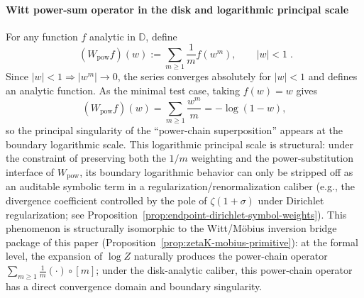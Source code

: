 \paragraph{Witt power-sum operator in the disk and logarithmic principal scale}
For any function \(f\) analytic in \(\mathbb{D}\), define
\begin{equation}\label{eq:app-witt-pow-operator}
\boxed{\;
(W_{\mathrm{pow}}f)(w):=\sum_{m\ge 1}\frac{1}{m}f(w^m),\qquad |w|<1\; }.
\end{equation}
Since \(|w|<1\Rightarrow |w^m|\to 0\), the series converges absolutely for \(|w|<1\) and defines an analytic function.
As the minimal test case, taking \(f(w)=w\) gives
\[
(W_{\mathrm{pow}}f)(w)=\sum_{m\ge 1}\frac{w^m}{m}=-\log(1-w),
\]
so the principal singularity of the ``power-chain superposition'' appears at the boundary logarithmic scale.
This logarithmic principal scale is structural: under the constraint of preserving both the \(1/m\) weighting and the power-substitution interface of \(W_{\mathrm{pow}}\), its boundary logarithmic behavior can only be stripped off as an auditable symbolic term in a regularization/renormalization caliber (e.g., the divergence coefficient controlled by the pole of \(\zeta(1+\sigma)\) under Dirichlet regularization; see Proposition~\ref{prop:endpoint-dirichlet-symbol-weights}).
This phenomenon is structurally isomorphic to the Witt/M\"obius inversion bridge package of this paper (Proposition~\ref{prop:zetaK-mobius-primitive}): at the formal level, the expansion of \(\log Z\) naturally produces the power-chain operator \(\sum_{m\ge 1}\frac{1}{m}(\cdot)\circ[m]\); under the disk-analytic caliber, this power-chain operator has a direct convergence domain and boundary singularity.

